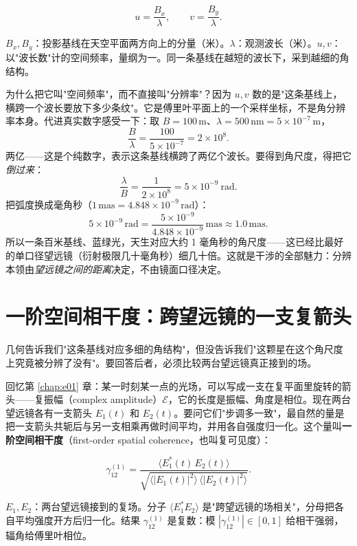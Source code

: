 \begin{equation}
  u=\frac{B_x}{\lambda},\qquad v=\frac{B_y}{\lambda}.
  \label{eq:e10-uv}
\end{equation}
\begin{formulaexplain}
\(B_x,B_y\)：投影基线在天空平面两方向上的分量（米）。\(\lambda\)：观测波长（米）。\(u,v\)：以"波长数"计的空间频率，量纲为一。同一条基线在越短的波长下，采到越细的角结构。
\end{formulaexplain}

为什么把它叫"空间频率"，而不直接叫"分辨率"？因为 \(u,v\) 数的是"这条基线上，横跨一个波长要放下多少条纹"。它是傅里叶平面上的一个采样坐标，不是角分辨率本身。代进真实数字感受一下：取 \(B=100\,\mathrm{m}\)、\(\lambda=500\,\mathrm{nm}=5\times10^{-7}\,\mathrm{m}\)，
\[
  \frac{B}{\lambda}=\frac{100}{5\times10^{-7}}=2\times10^{8}.
\]
两亿——这是个纯数字，表示这条基线横跨了两亿个波长。要得到角尺度，得把它\emph{倒过来}：
\[
  \frac{\lambda}{B}=\frac{1}{2\times10^{8}}=5\times10^{-9}\ \mathrm{rad}.
\]
把弧度换成毫角秒（\(1\,\mathrm{mas}=4.848\times10^{-9}\,\mathrm{rad}\)）：
\[
  5\times10^{-9}\,\mathrm{rad}=\frac{5\times10^{-9}}{4.848\times10^{-9}}\,\mathrm{mas}\approx1.0\,\mathrm{mas}.
\]
所以一条百米基线、蓝绿光，天生对应大约 1 毫角秒的角尺度——这已经比最好的单口径望远镜（衍射极限几十毫角秒）细几十倍。这就是干涉的全部魅力：分辨本领由\emph{望远镜之间的距离}决定，不由镜面口径决定。

\section{一阶空间相干度：跨望远镜的一支复箭头}
\label{sec:e10-gamma12}

几何告诉我们"这条基线对应多细的角结构"，但没告诉我们"这颗星在这个角尺度上究竟被分辨了没有"。要回答后者，必须比较两台望远镜真正接到的场。

回忆第 \ref{chap:e01} 章：某一时刻某一点的光场，可以写成一支在复平面里旋转的箭头——复振幅（complex amplitude）\(\mathcal E\)，它的长度是振幅、角度是相位。现在两台望远镜各有一支箭头 \(E_1(t)\) 和 \(E_2(t)\)。要问它们"步调多一致"，最自然的量是把一支箭头共轭后与另一支相乘再做时间平均，并用各自强度归一化。这个量叫\textbf{一阶空间相干度}（first-order spatial coherence，也叫复可见度）：

\begin{equation}
  \gamma_{12}^{(1)}
  =\frac{\big\langle E_1^{\ast}(t)\,E_2(t)\big\rangle}
        {\sqrt{\big\langle|E_1(t)|^2\big\rangle\,\big\langle|E_2(t)|^2\big\rangle}} .
  \label{eq:e10-gamma12}
\end{equation}
\begin{formulaexplain}
\(E_1,E_2\)：两台望远镜接到的复场。分子 \(\langle E_1^{\ast}E_2\rangle\) 是"跨望远镜的场相关"，分母把各自平均强度开方后归一化。结果 \(\gamma_{12}^{(1)}\) 是复数：模 \(|\gamma_{12}^{(1)}|\in[0,1]\) 给相干强弱，辐角给傅里叶相位。
\end{formulaexplain}

